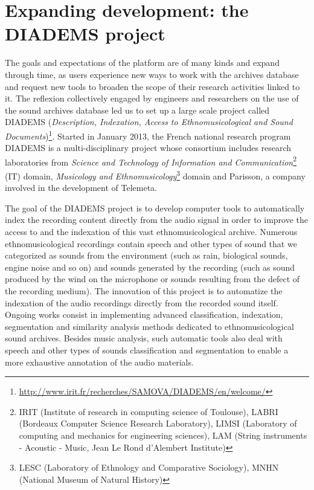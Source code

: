 \documentclass{sig-alternate}
\newcommand{\comment}[1]{\footnote{\color{red} \bf{{#1}}}}
\begin{document}
\section{Expanding development: the DIADEMS project}\label{sec:Diadems}

The goals and expectations of the platform are of many kinds and expand through time, as users experience new ways to work with the archives database and request new tools to broaden the scope of their research activities linked to it. The reflexion collectively engaged by engineers and researchers on the use of the sound archives database led us  to set up a large scale project called DIADEMS (\emph{Description, Indexation, Access to Ethnomusicological and Sound Documents})\footnote{\url{http://www.irit.fr/recherches/SAMOVA/DIADEMS/en/welcome/}}. 
Started in January 2013, the French national research program DIADEMS is a multi-disciplinary project whose consortium includes research laboratories from \emph{ Science and Technology of Information and Communication}\footnote{IRIT (Institute of research in computing science of Toulouse), LABRI (Bordeaux Computer Science Research Laboratory), LIMSI (Laboratory of computing and mechanics for engineering sciences), LAM (String instruments - Acoustic - Music, Jean Le Rond d'Alembert Institute)} (IT) domain, \emph{Musicology and Ethnomusicology}\footnote{LESC (Laboratory of Ethnology and Comparative Sociology), MNHN (National Museum of Natural History)} domain and Parisson, a company involved in the development of Telemeta.
 
The goal of the DIADEMS project is to develop computer tools to automatically index the recording content directly from the audio signal in order to improve the access to and the indexation of this vast ethnomusicological archive. Numerous ethnomusicological recordings contain speech and other types of sound that we categorized as sounds from the environment (such as rain, biological sounds, engine noise and so on) and sounds generated by the recording (such as sound produced by the wind on the microphone or sounds resulting from the defect of the recording medium). The innovation of this project is to automatize the indexation of the audio recordings directly from the recorded sound itself. Ongoing works consist in implementing advanced classification, indexation, segmentation and similarity analysis methods dedicated to ethnomusicological sound archives.  Besides music analysis, such automatic tools also deal with speech and other types of sounds classification and segmentation to enable a more exhaustive annotation of the audio materials.
\end{document}
